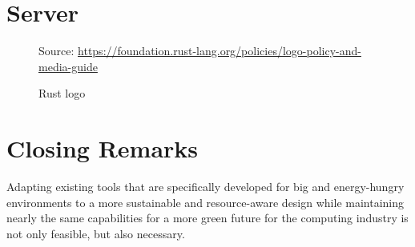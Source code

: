 
\section{Server}
\label{subsec:conclusions_limitations_and_future_works_server}



\begin{figure} %
  \centering
  \def\stackalignment{r} %
  {\scriptsize \parbox[t]{\linewidth}{ Source: \url{https://foundation.rust-lang.org/policies/logo-policy-and-media-guide}} }
  \caption{Rust logo}
\end{figure}

\section{Closing Remarks}
\label{sec:conclusions_closing_remarks}

Adapting existing tools that are specifically developed for big and energy-hungry
environments to a more sustainable and resource-aware design while maintaining
nearly the same capabilities for a more green future for the computing industry
is not only feasible, but also necessary.